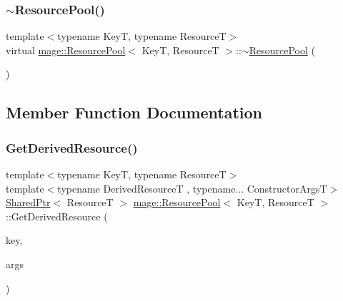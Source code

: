 \subsubsection{\texorpdfstring{$\sim$\+Resource\+Pool()}{~ResourcePool()}}
{\footnotesize\ttfamily template$<$typename KeyT, typename ResourceT$>$ \\
virtual \hyperlink{classmage_1_1_resource_pool}{mage\+::\+Resource\+Pool}$<$ KeyT, ResourceT $>$\+::$\sim$\hyperlink{classmage_1_1_resource_pool}{Resource\+Pool} (\begin{DoxyParamCaption}{ }\end{DoxyParamCaption})\hspace{0.3cm}{\ttfamily [virtual]}}



\subsection{Member Function Documentation}
\hypertarget{classmage_1_1_resource_pool_a2c1116cecf0a88953fa681f254de8680}{}\label{classmage_1_1_resource_pool_a2c1116cecf0a88953fa681f254de8680} 
\subsubsection{\texorpdfstring{Get\+Derived\+Resource()}{GetDerivedResource()}}
{\footnotesize\ttfamily template$<$typename KeyT, typename ResourceT$>$ \\
template$<$typename Derived\+ResourceT , typename... Constructor\+ArgsT$>$ \\
\hyperlink{namespacemage_a1e01ae66713838a7a67d30e44c67703e}{Shared\+Ptr}$<$ ResourceT $>$ \hyperlink{classmage_1_1_resource_pool}{mage\+::\+Resource\+Pool}$<$ KeyT, ResourceT $>$\+::Get\+Derived\+Resource (\begin{DoxyParamCaption}\item[{KeyT}]{key,  }\item[{Constructor\+ArgsT \&\&...}]{args }\end{DoxyParamCaption})}

\hypertarget{classmage_1_1_resource_pool_ae2f9964a1821c9b8cb38303a5a88c98e}{}\label{classmage_1_1_resource_pool_ae2f9964a1821c9b8cb38303a5a88c98e} 

